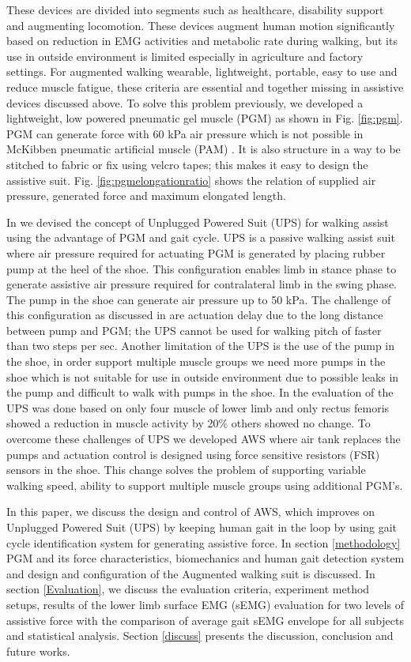 \documentclass[letterpaper, 10 pt, conference]{ieeeconf}  %
\begin{document}
These devices are divided into segments such as healthcare, disability support and augmenting locomotion. These devices augment human motion significantly based on reduction in EMG activities and metabolic rate during walking, but its use in outside environment is limited especially in agriculture and factory settings. For augmented walking wearable, lightweight, portable, easy to use and reduce muscle fatigue, these criteria are essential and together missing in assistive devices discussed above. To solve this problem previously, we developed a lightweight, low powered pneumatic gel muscle (PGM) \cite{14} as shown in Fig. \ref{fig:pgm}. PGM can generate force with 60 kPa air pressure which is not possible in McKibben pneumatic artificial muscle (PAM) \cite{15}. It is also structure in a way to be stitched to fabric or fix using velcro tapes; this makes it easy to design the assistive suit. Fig. \ref{fig:pgmelongationratio} shows the relation of supplied air pressure, generated force and maximum elongated length.

In \cite{16} we devised the concept of Unplugged Powered Suit (UPS) for walking assist using the advantage of PGM and gait cycle. UPS is a passive walking assist suit where air pressure required for actuating PGM is generated by placing rubber pump at the heel of the shoe. This configuration enables limb in stance phase to generate assistive air pressure required for contralateral limb in the swing phase. The pump in the shoe can generate air pressure up to 50 kPa. The challenge of this configuration as discussed in \cite{16} are actuation delay due to the long distance between pump and PGM; the UPS cannot be used for walking pitch of faster than two steps per sec. Another limitation of the UPS is the use of the pump in the shoe, in order support multiple muscle groups we need more pumps in the shoe which is not suitable for use in outside environment due to possible leaks in the pump and difficult to walk with pumps in the shoe. In the \cite{16} evaluation of the UPS was done based on only four muscle of lower limb and only rectus femoris showed a reduction in muscle activity by 20\% others showed no change. To overcome these challenges of UPS we developed AWS where air tank replaces the pumps and actuation control is designed using force sensitive resistors (FSR) sensors in the shoe. This change solves the problem of supporting variable walking speed, ability to support multiple muscle groups using additional PGM’s.

In this paper, we discuss the design and control of AWS, which improves on Unplugged Powered Suit (UPS) by keeping human gait in the loop by using gait cycle identification system for generating assistive force. In section \ref{methodology} PGM and its force characteristics, biomechanics and human gait detection system and design and configuration of the Augmented walking suit is discussed. In section \ref{Evaluation}, we discuss the evaluation criteria, experiment method setups, results of the lower limb surface EMG (sEMG) evaluation for two levels of assistive force with the comparison of average gait sEMG envelope for all subjects and statistical analysis. Section \ref{discuss} presents the discussion, conclusion and future works.
\end{document}
